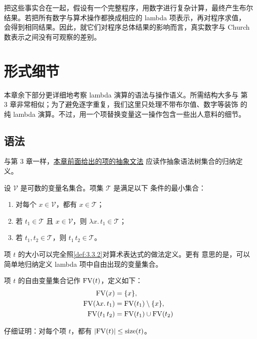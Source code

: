 把这些事实合在一起，假设有一个完整程序，用数字进行复杂计算，最终产生布尔
结果。若把所有数字与算术操作都换成相应的 lambda 项表示，再对程序求值，
会得到相同结果。因此，就它们对程序总体结果的影响而言，真实数字与 Church
数表示之间没有可观察的差别。

\section{形式细节}
\label{sec:5.3}

本章余下部分更详细地考察 lambda 演算的语法与操作语义。所需结构大多与
第 3 章非常相似；为了避免逐字重复，我们这里只处理不带布尔值、数字等装饰
的纯 lambda 演算。不过，用一个项替换变量这一操作包含一些出人意料的细节。

\subsection*{语法}

与第 3 章一样，\hyperref[grammar:5.1-terms]{本章前面给出的项的抽象文法}
应读作抽象语法树集合的归纳定义。

\begin{definition}[项]
\label{def:5.3.1}
设 \(\mathcal{V}\) 是可数的变量名集合。项集 \(\mathcal{T}\) 是满足以下
条件的最小集合：
\begin{enumerate}
  \item 对每个 \(x\in\mathcal{V}\)，都有 \(x\in\mathcal{T}\)；
  \item 若 \(t_1\in\mathcal{T}\) 且 \(x\in\mathcal{V}\)，则
    \(\lambda x.\,t_1\in\mathcal{T}\)；
  \item 若 \(t_1,t_2\in\mathcal{T}\)，则
    \(t_1\,t_2\in\mathcal{T}\)。
\end{enumerate}
\end{definition}

项 \(t\) 的大小可以完全照\cref{def:3.3.2}对算术表达式的做法定义。更有
意思的是，可以简单地归纳定义 lambda 项中自由出现的变量集合。

\begin{definition}
\label{def:5.3.2}
项 \(t\) 的自由变量集合记作 \(\operatorname{FV}(t)\)，定义如下：
\[
\begin{aligned}
 \operatorname{FV}(x)&=\{x\},\\
 \operatorname{FV}(\lambda x.\,t_1)&=\operatorname{FV}(t_1)\setminus\{x\},\\
 \operatorname{FV}(t_1\,t_2)&=\operatorname{FV}(t_1)\cup\operatorname{FV}(t_2)
\end{aligned}
\]
\end{definition}

\begin{exercise}[\(\star\star\)]
\label{ex:5.3.3}
仔细证明：对每个项 \(t\)，都有
\(\lvert\operatorname{FV}(t)\rvert\leq\operatorname{size}(t)\)。
\end{exercise}

